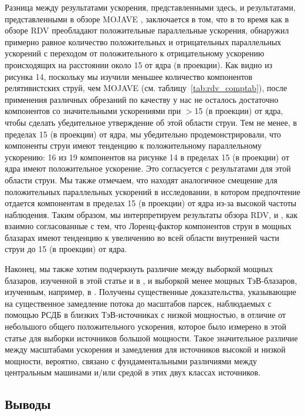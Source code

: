 Разница между результатами ускорения, представленными здесь, и результатами, представленными в
обзоре MOJAVE \cite{Homan_2009}, заключается в том, что в то время как в обзоре RDV преобладают
положительные параллельные ускорения, \cite{Homan_2009} обнаружил примерно равное количество
положительных и отрицательных параллельных ускорений с переходом от положительного к отрицательному
ускорению происходящих на расстоянии около \SI{15}{\parsec} от ядра (в проекции). Как видно из
рисунка 14, поскольку мы изучили меньшее количество компонентов релятивистских струй, чем MOJAVE
(см. таблицу~\ref{tab:rdv_comptab}), после применения различных обрезаний по качеству у нас не
осталось достаточно компонентов со значительными ускорениями при $>$\SI{15}{\parsec} (в проекции) от
ядра, чтобы сделать убедительное утверждение об этой области струи. Тем не менее, в пределах
\SI{15}{\parsec} (в проекции) от ядра, мы убедительно продемонстрировали, что компоненты струи
имеют тенденцию к положительному параллельному ускорению: 16 из 19 компонентов на рисунке 14 в
пределах \SI{15}{\parsec} (в проекции) от ядра имеют положительное ускорение. Это согласуется с
результатами \cite{Homan_2009} для этой области струи. Мы также отмечаем, что \cite{Jorstad_2005}
находят аналогичное смещение для положительных параллельных ускорений в исследовании, в котором
предпочтение отдается компонентам в пределах \SI{15}{\parsec} (в проекции) от ядра из-за высокой
частоты наблюдения. Таким образом, мы интерпретируем результаты обзора RDV, \cite{Homan_2009} и
\cite{Jorstad_2005}, как взаимно согласованные с тем, что Лоренц-фактор компонентов струи в
мощных блазарах имеют тенденцию к увеличению во всей области внутренней части струи до
\SI{15}{\parsec} (в проекции) от ядра.

Наконец, мы также хотим подчеркнуть различие между выборкой мощных блазаров, изученной в этой
статье и в \cite{Piner_2007}, и выборкой менее мощных ТэВ-блазаров, изученным, например, в
\cite{Piner_2010}. Получены существенные доказательства, указывающие на существенное замедление
потока до масштабов парсек, наблюдаемых с помощью РСДБ в близких ТэВ-источниках с низкой мощностью,
в отличие от небольшого общего положительного ускорения, которое было измерено в этой статье для
выборки источников большой мощности. Такое значительное различие между масштабами ускорения и
замедления для источников высокой и низкой мощности, вероятно, связано с фундаментальными различиями
между центральным машинами и/или средой в этих двух классах источников.

\subsection{Выводы}

